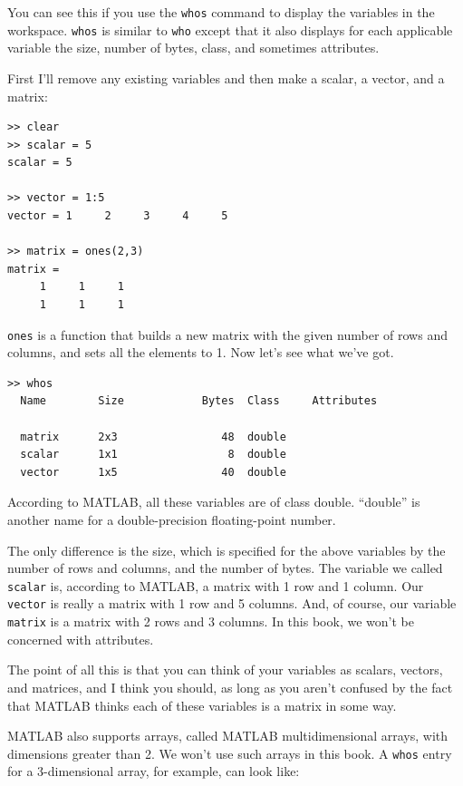 \documentclass[
]{book}
\begin{document}
You can see this if you use the {\tt whos} command to display the
variables in the workspace.  {\tt whos}  
is similar to {\tt who}  except
that it also displays for each applicable variable the size, number 
of bytes, class, and sometimes attributes.

First I'll remove any existing variables and then 
make a scalar, a vector, and a matrix:

\begin{verbatim}
>> clear
>> scalar = 5
scalar = 5

>> vector = 1:5
vector = 1     2     3     4     5

>> matrix = ones(2,3)
matrix =
     1     1     1
     1     1     1
\end{verbatim}

{\tt ones} is a function that builds a new matrix with the given
number of rows and columns, and sets all the elements to 1.
Now let's see what we've got.

\begin{verbatim}
>> whos
  Name        Size            Bytes  Class     Attributes
              
  matrix      2x3                48  double              
  scalar      1x1                 8  double              
  vector      1x5                40  double              
\end{verbatim}

According to MATLAB, all these variables are of class double.  ``double''
is another name for a double-precision floating-point number.

The only difference is the size, which is specified for the above variables by the number of
rows and columns, and the number of bytes.  The variable we called {\tt scalar} is, according to
MATLAB, a matrix with 1 row and 1 column.  Our {\tt vector} is
really a matrix with 1 row and 5 columns.  And, of course, our variable {\tt
matrix} is a matrix with 2 rows and 3 columns.  In this book, we won't be
concerned with attributes.  

The point of all this is that you can think of your variables as
scalars, vectors, and matrices, and I think you should, as long
as you aren't confused by the fact that MATLAB thinks each of these 
variables is a matrix in some way.

MATLAB also supports arrays, called MATLAB multidimensional arrays, with dimensions greater than 2.
We won't use such arrays in this book.  A {\tt whos} entry for a 3-dimensional array, for example, 
can look like:
\end{document}
